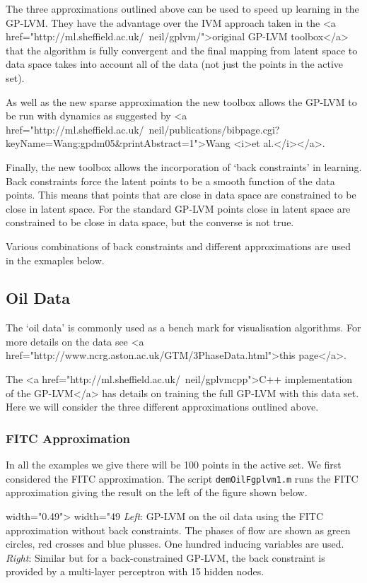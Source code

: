 The three approximations outlined above can be used to speed up learning in the GP-LVM. They have the advantage over the IVM approach taken in the <a href="http://ml.sheffield.ac.uk/~neil/gplvm/">original GP-LVM toolbox</a> that the algorithm is fully convergent and the final mapping from latent space to data space takes into account all of the data (not just the points in the active set).

As well as the new sparse approximation the new toolbox allows the GP-LVM to be run with dynamics as suggested by <a href="http://ml.sheffield.ac.uk/~neil/publications/bibpage.cgi?keyName=Wang:gpdm05&printAbstract=1">Wang <i>et al.</i></a>.

Finally, the new toolbox allows the incorporation of `back constraints' in learning. Back constraints force the latent points to be a smooth function of the data points. This means that points that are close in data space are constrained to be close in latent space. For the standard GP-LVM points close in latent space are constrained to be close in data space, but the converse is not true.

Various combinations of back constraints and different approximations are used in the exmaples below.

\subsection{Oil Data}

The `oil data' is commonly used as a bench mark for visualisation algorithms. For more details on the data see <a href="http://www.ncrg.aston.ac.uk/GTM/3PhaseData.html">this page</a>.

The <a href="http://ml.sheffield.ac.uk/~neil/gplvmcpp">C++ implementation of the GP-LVM</a> has details on training the full GP-LVM with this data set. Here we will consider the three different approximations outlined above.

\subsubsection{FITC Approximation}

In all the examples we give there will be 100 points in the active set. We first considered the FITC approximation. The script \texttt{demOilFgplvm1.m} runs the FITC approximation giving the result on the left of the figure shown below.

\begin{center} width="0.49\textwidth"> width="49%
\emph{Left}: GP-LVM on the oil data using the FITC approximation without back constraints. The phases of flow are shown as green circles, red crosses and blue plusses.  One hundred inducing variables are used. \emph{Right}: Similar but for a back-constrained GP-LVM, the back constraint is provided by a multi-layer perceptron with 15 hidden nodes.\end{center}


